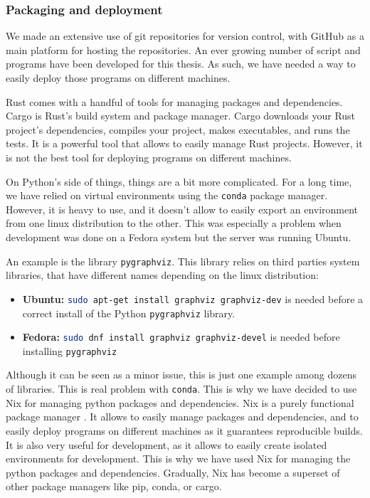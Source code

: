     \subsubsection{Packaging and deployment}
    We made an extensive use of git repositories for version control, with GitHub as a main platform for hosting the repositories. An ever growing number of script and programs have been developed for this thesis. As such, we have needed a way to easily deploy those programs on different machines.

    Rust comes with a handful of tools for managing packages and dependencies. Cargo is Rust's build system and package manager. Cargo downloads your Rust project's dependencies, compiles your project, makes executables, and runs the tests. It is a powerful tool that allows to easily manage Rust projects. However, it is not the best tool for deploying programs on different machines. 

    On Python's side of things, things are a bit more complicated. For a long time, we have relied on virtual environments using the \texttt{conda} package manager. However, it is heavy to use, and it doesn't allow to easily export an environment from one linux distribution to the other. This was especially a problem when development was done on a Fedora system but the server was running Ubuntu. 

    An example is the library \texttt{pygraphviz}. This library relies on third parties system libraries, that have different names depending on the linux distribution:
    
    \begin{itemize}
        \item \textbf{Ubuntu:} \lstinline[language=bash]|sudo apt-get install graphviz graphviz-dev| is needed before a correct install of the Python \texttt{pygraphviz} library. 
        \item \textbf{Fedora:} \lstinline[language=bash]|sudo dnf install graphviz graphviz-devel| is needed before installing \texttt{pygraphviz}
    \end{itemize}

    Although it can be seen as a minor issue, this is just one example among dozens of libraries. This is real problem with \texttt{conda}. This is why we have decided to use Nix for managing python packages and dependencies. Nix is a purely functional package manager \cite{NixOriginalThesis06}. It allows to easily manage packages and dependencies, and to easily deploy programs on different machines as it guarantees reproducible builds. It is also very useful for development, as it allows to easily create isolated environments for development. This is why we have used Nix for managing the python packages and dependencies. Gradually, Nix has become a superset of other package managers like pip, conda, or cargo. 
    
